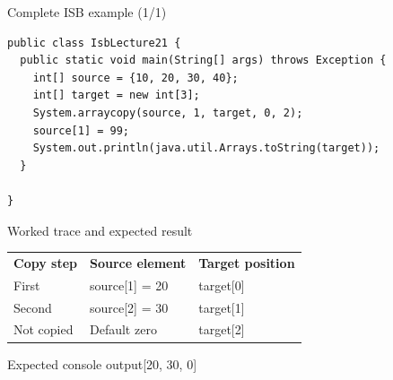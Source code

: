 \documentclass[10pt,aspectratio=169]{beamer}
\begin{document}
\begin{frame}[fragile,t]{Complete ISB example (1/1)}
\begin{lstlisting}
public class IsbLecture21 {
  public static void main(String[] args) throws Exception {
    int[] source = {10, 20, 30, 40};
    int[] target = new int[3];
    System.arraycopy(source, 1, target, 0, 2);
    source[1] = 99;
    System.out.println(java.util.Arrays.toString(target));
  }

}
\end{lstlisting}
\end{frame}

\begin{frame}[fragile,t]{Worked trace and expected result}
\small\renewcommand{\arraystretch}{1.4}
\begin{tabularx}{\textwidth}{>{\raggedright\arraybackslash}X>{\raggedright\arraybackslash}X>{\raggedright\arraybackslash}X}\rowcolor{navy}
\color{white}\bfseries Copy step & \color{white}\bfseries Source element & \color{white}\bfseries Target position\\
First & source[1] = 20 & target[0]\\
Second & source[2] = 30 & target[1]\\
Not copied & Default zero & target[2]\\
\end{tabularx}\par\vspace{2mm}
\begin{block}{Expected console output}\ttfamily\footnotesize [20, 30, 0]\end{block}
\end{frame}
\end{document}
